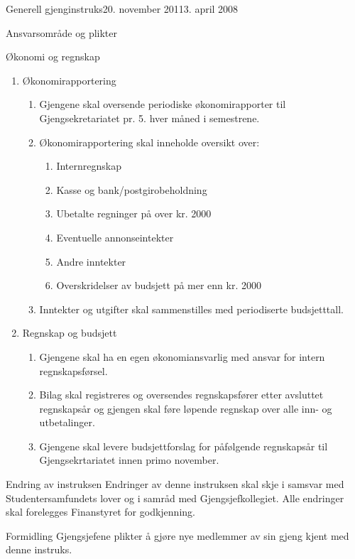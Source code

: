 \begin{instruks}{Generell gjenginstruks}{20. november 2011}{3. april 2008}
\begin{instruksledd}{Ansvarsområde og plikter}
    \end{instruksledd}

	\begin{instruksledd}{Økonomi og regnskap}
		\begin{enumerate}
			\item Økonomirapportering
			\begin{enumerate}  
				\item Gjengene skal oversende periodiske økonomirapporter til
				Gjengsekretariatet pr. 5. hver måned i semestrene.
				\item Økonomirapportering skal inneholde oversikt over:
				\begin {enumerate} 
					\item Internregnskap
					\item Kasse og bank/postgirobeholdning
					\item Ubetalte regninger på over kr. 2000
					\item Eventuelle annonseintekter
					\item Andre inntekter
					\item Overskridelser av budsjett på mer enn kr. 2000
				\end {enumerate}
				\item Inntekter og utgifter skal sammenstilles med periodiserte 
				budsjetttall.
			\end {enumerate}
			\item {Regnskap og budsjett}
			\begin {enumerate}
				\item Gjengene skal ha en egen økonomiansvarlig med ansvar for intern 
				regnskapsførsel.
				\item Bilag skal registreres og oversendes regnskapsfører etter avsluttet 
				regnskapsår og gjengen skal føre løpende regnskap over alle inn- og 
				utbetalinger.
				\item Gjengene skal levere budsjettforslag for påfølgende regnskapsår til 
				Gjengsekrtariatet innen primo november.
			\end {enumerate}
		\end{enumerate}

	\end{instruksledd}

	\begin{instruksledd}{Endring av instruksen}
		Endringer av denne instruksen skal skje i samsvar med Studentersamfundets lover og i samråd 
		med Gjengsjefkollegiet. Alle endringer skal forelegges Finanstyret for godkjenning.

	\end{instruksledd}

	\begin{instruksledd}{Formidling}
		Gjengsjefene plikter å gjøre nye medlemmer av sin gjeng kjent med denne instruks.

	\end{instruksledd}
 	
\end{instruks}



